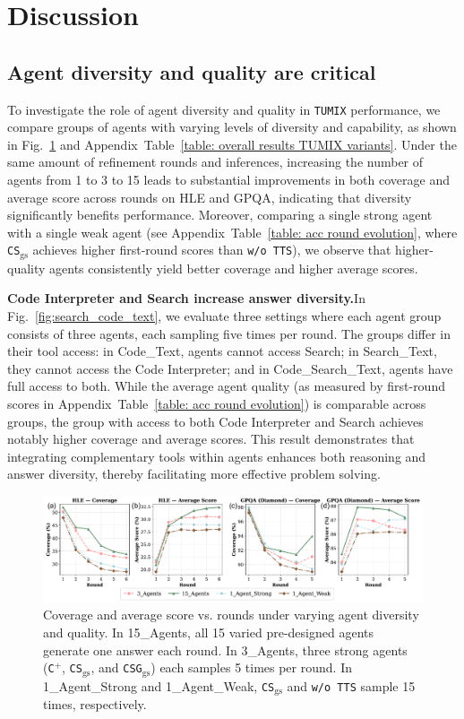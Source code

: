 \section{Discussion}
\subsection{Agent diversity and quality are critical}
To investigate the role of agent diversity and quality in \texttt{TUMIX} performance, we compare groups of agents with varying levels of diversity and capability, as shown in Fig.~\ref{fig:diversity_quality_HLE_GPQA} and Appendix~Table~\ref{table: overall results TUMIX variants}. Under the same amount of refinement rounds and inferences, increasing the number of agents from 1 to 3 to 15 leads to substantial improvements in both coverage and average score across rounds on HLE and GPQA, indicating that diversity significantly benefits performance. Moreover, comparing a single strong agent with a single weak agent (see Appendix~Table~\ref{table: acc round evolution}, where \texttt{CS$_{\text{gs}}$} achieves higher first-round scores than \texttt{w/o TTS}), we observe that higher-quality agents consistently yield better coverage and higher average scores.

\textbf{Code Interpreter and Search increase answer diversity.}\quad In Fig.~\ref{fig:search_code_text}, we evaluate three settings where each agent group consists of three agents, each sampling five times per round. The groups differ in their tool access: in Code\_Text, agents cannot access Search; in Search\_Text, they cannot access the Code Interpreter; and in Code\_Search\_Text, agents have full access to both. While the average agent quality (as measured by first-round scores in Appendix~Table~\ref{table: acc round evolution}) is comparable across groups, the group with access to both Code Interpreter and Search achieves notably higher coverage and average scores. This result demonstrates that integrating complementary tools within agents enhances both reasoning and answer diversity, thereby facilitating more effective problem solving.

\begin{figure}[ht]
  \centering
  \includegraphics[width=0.98\linewidth]{Figures/diversity_quality_HLE_GPQA.pdf}
   \caption{Coverage and average score vs. rounds under varying agent diversity and quality. In 15\_Agents, all 15 varied pre-designed agents generate one answer each round. In 3\_Agents, three strong agents (\texttt{C$^+$}, \texttt{CS$_{\text{gs}}$}, and \texttt{CSG$_{\text{gs}}$}) each samples 5 times per round. In 1\_Agent\_Strong and 1\_Agent\_Weak, \texttt{CS$_{\text{gs}}$} and \texttt{w/o TTS} sample 15 times, respectively.}
   \label{fig:diversity_quality_HLE_GPQA}
\end{figure}

